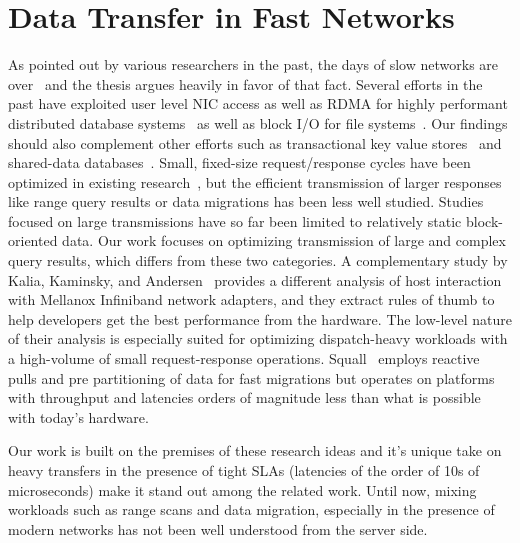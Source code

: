 \section{Data Transfer in Fast Networks}
As pointed out by various researchers in the past, the days of slow networks are over~\cite{slow}
and the thesis argues heavily in favor of that fact. Several efforts in the past have exploited
user level NIC access as well as RDMA for highly performant distributed database systems~\cite{ramcloud,farm,farmtx,drtm,hyper}
as well as block I/O for file systems~\cite{rdmagfs}.
Our findings should also complement other efforts such as transactional key value stores~\cite{deuteronomy} 
and shared-data databases~\cite{tell}. Small, fixed-size request/response cycles have been optimized in
existing research~\cite{farm,herd,mica,rdma,ramcloud}, but the efficient
transmission of larger responses like range query results or data
migrations has been less well studied. Studies focused on large transmissions
have so far been limited to relatively static block-oriented data.
Our work focuses on optimizing transmission of large and complex query
results, which differs from these two categories. A complementary study by Kalia, Kaminsky, and Andersen~\cite{rdma} provides a
different analysis of host interaction with Mellanox Infiniband network adapters,
and they extract rules of thumb to help developers get the best performance from the hardware.
The low-level nature of their analysis is especially suited for
optimizing dispatch-heavy workloads with a high-volume of small
request-response operations. Squall~\cite{squall} employs reactive pulls and pre partitioning
of data for fast migrations but operates on platforms with throughput and latencies orders of 
magnitude less than what is possible with today's hardware.

Our work is built on the premises of these research ideas and it's unique take on
heavy transfers in the presence of tight SLAs (latencies of the order of 10s of microseconds)
make it stand out among the related work. Until now, mixing workloads such as range scans 
and data migration, especially in the presence of modern networks has not been well
 understood from the server side.